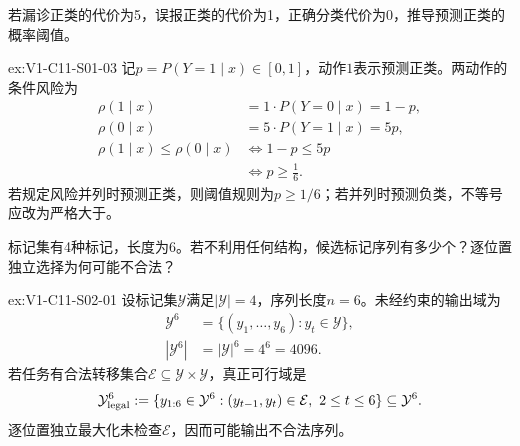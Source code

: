 \begin{SLChapterExercisePairSection}
\begin{exercise}\label{ex:V1-C11-S01-03}
若漏诊正类的代价为5，误报正类的代价为1，正确分类代价为0，推导预测正类的概率阈值。
\end{exercise}
\label{sol:V1-C11-S01-03}
\begin{chapterexercisesolution}{ex:V1-C11-S01-03}
记$p=P(Y=1\mid x)\in[0,1]$，动作$1$表示预测正类。两动作的条件风险为
\[
\begin{aligned}
\rho(1\mid x)&=1\cdot P(Y=0\mid x)=1-p,\\
\rho(0\mid x)&=5\cdot P(Y=1\mid x)=5p,\\
\rho(1\mid x)\le\rho(0\mid x)
  &\Longleftrightarrow 1-p\le5p\\
  &\Longleftrightarrow p\ge\frac16.
\end{aligned}
\]
若规定风险并列时预测正类，则阈值规则为$p\ge1/6$；若并列时预测负类，不等号应改为严格大于。
\end{chapterexercisesolution}

\begin{exercise}\label{ex:V1-C11-S02-01}
标记集有4种标记，长度为6。若不利用任何结构，候选标记序列有多少个？逐位置独立选择为何可能不合法？
\end{exercise}
\label{sol:V1-C11-S02-01}
\begin{chapterexercisesolution}{ex:V1-C11-S02-01}
设标记集$\mathcal Y$满足$|\mathcal Y|=4$，序列长度$n=6$。未经约束的输出域为
\[
\begin{aligned}
\mathcal Y^6
  &=\{(y_1,\ldots,y_6):y_t\in\mathcal Y\},\\
|\mathcal Y^6|&=|\mathcal Y|^6=4^6=4096.
\end{aligned}
\]
若任务有合法转移集合$\mathcal E\subseteq\mathcal Y\times\mathcal Y$，真正可行域是
\[
\begin{aligned}
\mathcal Y_{\rm legal}^{6}
  :=\{y_{1:6}\in\mathcal Y^6:
      (y_{t-1},y_t)\in\mathcal E,\ 2\le t\le6\}
  \subseteq\mathcal Y^6.
\end{aligned}
\]
逐位置独立最大化未检查$\mathcal E$，因而可能输出不合法序列。
\end{chapterexercisesolution}


\end{SLChapterExercisePairSection}
